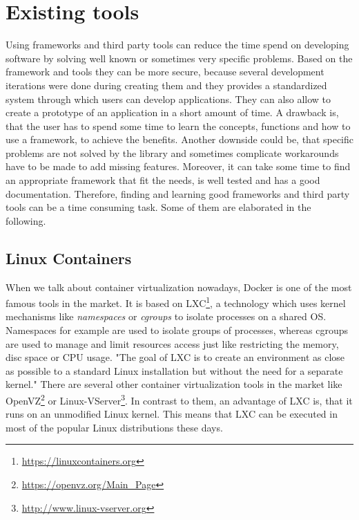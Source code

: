 \section{Existing tools}

Using frameworks and third party tools can reduce the time spend on developing software by solving well known or sometimes very specific problems.
Based on the framework and tools they can be more secure, because several development iterations were done during creating them and they provides a standardized system through which users can develop applications.
They can also allow to create a prototype of an application in a short amount of time.
A drawback is, that the user has to spend some time to learn the concepts, functions and how to use a framework, to achieve the benefits.
Another downside could be, that specific problems are not solved by the library and sometimes complicate workarounds have to be made to add missing features.
Moreover, it can take some time to find an appropriate framework that fit the needs, is well tested and has a good documentation.
Therefore, finding and learning good frameworks and third party tools can be a time consuming task.
Some of them are elaborated in the following.

\subsection{Linux Containers}
When we talk about container virtualization nowadays, Docker is one of the most famous tools in the market.
It is based on \ac{LXC}\footnote{\url{https://linuxcontainers.org}}, a technology which uses kernel mechanisms like \textit{namespaces} or \textit{cgroups} to isolate processes on a shared \ac{OS}.\autocite[cf.][p. 381]{Pahl:2015}
Namespaces for example are used to isolate groups of processes, whereas cgroups are used to manage and limit resources access just like restricting the memory, disc space or \ac{CPU} usage.\autocite[cf.][p. 381]{Pahl:2015}
"The goal of \ac{LXC} is to create an environment as close as possible to a standard Linux installation but without the need for a separate kernel."\autocite[p. 72]{Tosatto:2015}
There are several other container virtualization tools in the market like OpenVZ\footnote{\url{https://openvz.org/Main_Page}} or Linux-VServer\footnote{\url{http://www.linux-vserver.org}}.
In contrast to them, an advantage of \ac{LXC} is, that it runs on an unmodified Linux kernel.
This means that \ac{LXC} can be executed in most of the popular Linux distributions these days.

